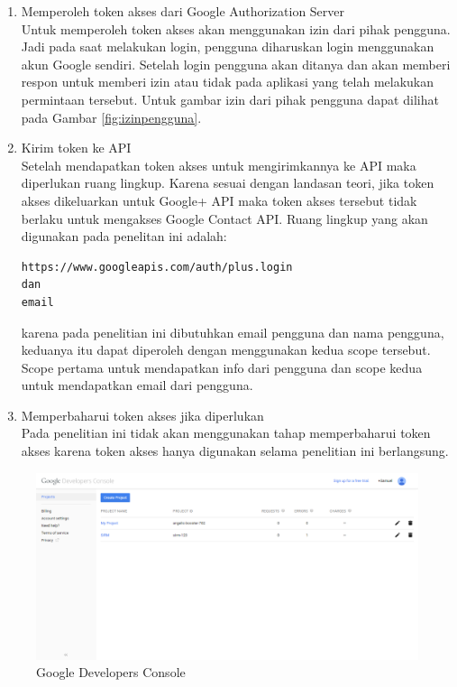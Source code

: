 \begin{enumerate}[(1)]
\begin{enumerate}
{    secret} yang didapat dapat dilihat di bawah ini.
\begin{lstlisting}
Client id:
568951368854-ufmbistn0pcaq0khubafo1a133orfgve.apps.googleusercontent.com
Client secret:
-cSZ-AUmeQ9PaWWry_IpiBBi
\end{lstlisting}
Agar lebih jelas dapat dilihat pada Gambar \ref{fig:clientid}.
    \end{enumerate}
\item Memperoleh token akses dari Google Authorization Server\\
Untuk memperoleh token akses akan menggunakan izin dari pihak pengguna. Jadi
pada saat melakukan login, pengguna diharuskan login menggunakan akun Google
sendiri. Setelah login pengguna akan ditanya dan akan memberi respon untuk
memberi izin atau tidak pada aplikasi yang telah melakukan permintaan tersebut.
Untuk gambar izin dari pihak pengguna dapat dilihat pada Gambar
\ref{fig:izinpengguna}.
\item Kirim token ke API\\
Setelah mendapatkan token akses untuk mengirimkannya ke API maka diperlukan
ruang lingkup. Karena sesuai dengan landasan teori, jika token akses dikeluarkan
untuk Google+ API maka token akses tersebut tidak berlaku untuk mengakses Google
Contact API. Ruang lingkup yang akan digunakan pada penelitan ini adalah:
\begin{lstlisting}
https://www.googleapis.com/auth/plus.login
dan
email
\end{lstlisting}
karena pada penelitian ini dibutuhkan email pengguna dan nama pengguna, keduanya
itu dapat diperoleh dengan menggunakan kedua scope tersebut. Scope pertama untuk
mendapatkan info dari pengguna dan scope kedua untuk mendapatkan email dari
pengguna.
\item Memperbaharui token akses jika diperlukan\\
Pada penelitian ini tidak akan menggunakan tahap memperbaharui token akses
karena token akses hanya digunakan selama penelitian ini berlangsung.
\end{enumerate}

\begin{figure}[H]
\centering
\includegraphics[scale=0.4]{Gambar/GDC.png}
\caption[Google Developers Console]{Google Developers Console} 
\label{fig:gdc}
\end{figure}

